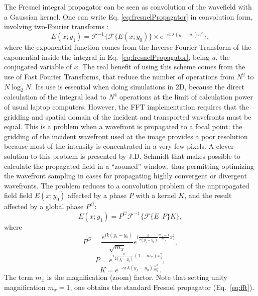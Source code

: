 \documentclass{iucr}
\begin{document}
The Fresnel integral propagator can be seen as convolution of the wavefield with a Gaussian kernel. One can write Eq. \ref{eq:fresnelPropagator} in convolution form, involving two-Fourier transforms \cite{goodmanfourier}:
\begin{equation}\label{eq:fft}
E(x; y_1) = \mathcal{F}^{-1}\Big\{ \mathcal{F}\{E(x; y_0)\} \times e^{-i \pi \lambda (y_1-y_0) u^2} \Big\},
\end{equation} 
where the exponential function comes from the Inverse Fourier Transform of the exponential inside the integral in Eq.~\ref{eq:fresnelPropagator}, being $u$, the conjugated variable of $x$. 
The real benefit of using this scheme comes from the use of Fast Fourier Transforms, that reduce the number of operations from $N^2$ to $N \log_2 N$. Its use is essential when doing simulations in 2D, because the direct calculation of the integral lead to $N^4$ operations at the limit of calculation power of usual laptop computers. However, the FFT implementation requires that the gridding and spatial domain of the incident and transported wavefronts must be equal. This is a problem when a wavefront is propagated to a focal point: the gridding of the incident wavefront used at the image provides a poor resolution because most of the intensity is concentrated in a very few pixels. A clever solution to this problem is presented by J.D. Schmidt \cite{schmidt} that makes possible to calculate the propagated field in a ``zoomed'' window, thus permitting optimizing the wavefront sampling in cases for propagating highly convergent or divergent wavefronts. The problem reduces to a convolution problem of the unpropagated field field $E(x;y_0)$ affected by a phase $P$ with a kernel $K$, and the result affected by a global phase $P^G$: 
\begin{equation}
E(x; y_1) = P^G \mathcal{F}^{-1} \Big\{ \mathcal{F} \big\{ E~~P \big\} K \Big\},
\end{equation}
where
\begin{equation}
P^G =  \frac { e^{ik(y_1-y_0) }}{\sqrt{m_x} }e^{i \frac{k}{2 (y_1-y_0)} \frac{m_x - 1}{m_x}x_2^2},
\end{equation}
\begin{equation}
P = e^{i \frac{k}{2(y_1-y_0)} (1-m_x)x_1^2 },
\end{equation}
\begin{equation}
K = e^{-i \pi \lambda (y_1-y_0) \frac{u^2}{m_x} }.
\end{equation}
The term $m_x$ is the magnification (zoom) factor. 
Note that setting unity magnification $m_x=1$, one obtains the standard Fresnel propagator (Eq.~\ref{eq:fft}).
\end{document}

